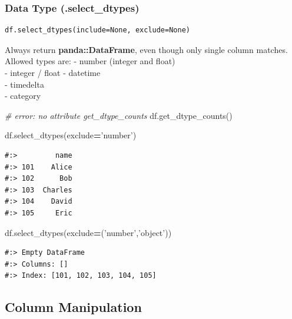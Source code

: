 \documentclass[
]{book}
\newenvironment{Shaded}{\begin{snugshade}}{\end{snugshade}}
\newcommand{\CommentTok}[1]{\textcolor[rgb]{0.37,0.37,0.37}{\textit{#1}}}
\newcommand{\NormalTok}[1]{#1}
\newcommand{\OperatorTok}[1]{\textcolor[rgb]{0.43,0.43,0.43}{\textbf{#1}}}
\newcommand{\StringTok}[1]{\textcolor[rgb]{0.5,0.5,0.5}{#1}}
\begin{document}
\hypertarget{data-type-.select_dtypes}{%
\subsubsection{Data Type (.select\_dtypes)}\label{data-type-.select_dtypes}}

\begin{verbatim}
df.select_dtypes(include=None, exclude=None)
\end{verbatim}

Always return \textbf{panda::DataFrame}, even though only single column matches.\\
Allowed types are: - number (integer and float)\\
- integer / float - datetime\\
- timedelta\\
- category

\begin{Shaded}
\begin{Highlighting}[]
\CommentTok{# error: no attribute get_dtype_counts}
\NormalTok{df.get_dtype_counts()}
\end{Highlighting}
\end{Shaded}

\begin{Shaded}
\begin{Highlighting}[]
\NormalTok{df.select_dtypes(exclude}\OperatorTok{=}\StringTok{'number'}\NormalTok{)}
\end{Highlighting}
\end{Shaded}

\begin{verbatim}
#:>         name
#:> 101    Alice
#:> 102      Bob
#:> 103  Charles
#:> 104    David
#:> 105     Eric
\end{verbatim}

\begin{Shaded}
\begin{Highlighting}[]
\NormalTok{df.select_dtypes(exclude}\OperatorTok{=}\NormalTok{(}\StringTok{'number'}\NormalTok{,}\StringTok{'object'}\NormalTok{))}
\end{Highlighting}
\end{Shaded}

\begin{verbatim}
#:> Empty DataFrame
#:> Columns: []
#:> Index: [101, 102, 103, 104, 105]
\end{verbatim}

\hypertarget{column-manipulation-1}{%
\subsection{Column Manipulation}\label{column-manipulation-1}}
\end{document}
